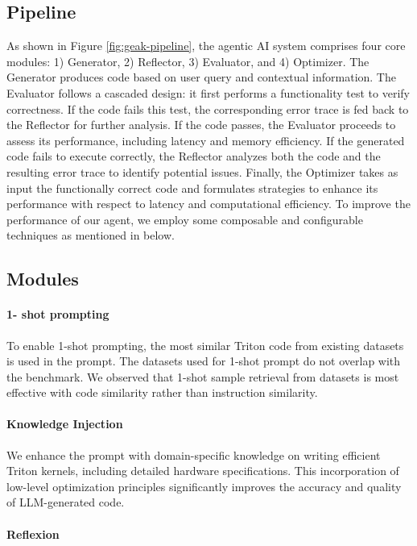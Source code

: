 \subsection{Pipeline}
\label{sec:geak-pipeline}

As shown in Figure \ref{fig:geak-pipeline}, the agentic AI system comprises four core modules: 1) Generator, 2) Reflector, 3) Evaluator, and 4) Optimizer. The Generator produces code based on user query and contextual information. The Evaluator follows a cascaded design: it first performs a functionality test to verify correctness. If the code fails this test, the corresponding error trace is fed back to the Reflector for further analysis. If the code passes, the Evaluator proceeds to assess its performance, including latency and memory efficiency. If the generated code fails to execute correctly, the Reflector analyzes both the code and the resulting error trace to identify potential issues. Finally, the Optimizer takes as input the functionally correct code and formulates strategies to enhance its performance with respect to latency and computational efficiency. 
To improve the performance of our agent, we employ some composable and configurable techniques as mentioned in below.

\subsection{Modules}
\paragraph{1- shot prompting}

To enable 1-shot prompting, the most similar Triton code from existing datasets is used in the prompt. The datasets used for 1-shot prompt do not overlap with the benchmark. We observed that 1-shot sample retrieval from datasets is most effective with code similarity rather than instruction similarity. 

\paragraph{Knowledge Injection} 

We enhance the prompt with domain-specific knowledge on writing efficient Triton kernels, including detailed hardware specifications. This incorporation of low-level optimization principles significantly improves the accuracy and quality of LLM-generated code. 

\paragraph{Reflexion}

